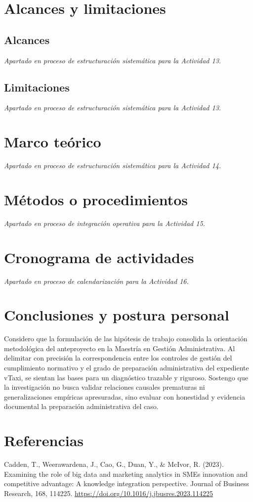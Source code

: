 {\section{Alcances y limitaciones}
\subsection{Alcances}
\emph{Apartado en proceso de estructuración sistemática para la Actividad 13.}

\subsection{Limitaciones}
\emph{Apartado en proceso de estructuración sistemática para la Actividad 13.}

\section{Marco teórico}
\emph{Apartado en proceso de estructuración sistemática para la Actividad 14.}

\section{Métodos o procedimientos}
\emph{Apartado en proceso de integración operativa para la Actividad 15.}

\section{Cronograma de actividades}
\emph{Apartado en proceso de calendarización para la Actividad 16.}

\section{Conclusiones y postura personal}
Considero que la formulación de las hipótesis de trabajo consolida la orientación metodológica del anteproyecto en la Maestría en Gestión Administrativa. Al delimitar con precisión la correspondencia entre los controles de gestión del cumplimiento normativo y el grado de preparación administrativa del expediente vTaxi, se sientan las bases para un diagnóstico trazable y riguroso. Sostengo que la investigación no busca validar relaciones causales prematuras ni generalizaciones empíricas apresuradas, sino evaluar con honestidad y evidencia documental la preparación administrativa del caso.

\clearpage\section*{Referencias}
Cadden, T., Weerawardena, J., Cao, G., Duan, Y., \& McIvor, R. (2023). Examining the role of big data and marketing analytics in SMEs innovation and competitive advantage: A knowledge integration perspective. Journal of Business Research, 168, 114225. \url{https://doi.org/10.1016/j.jbusres.2023.114225}


}
